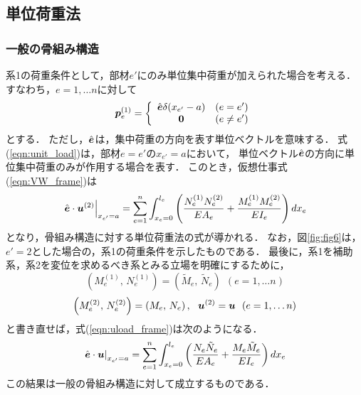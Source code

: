 \documentclass[10pt,a4j]{jarticle}
\begin{document}
\subsection{単位荷重法}
\subsubsection{一般の骨組み構造}
系1の荷重条件として，部材$e'$にのみ単位集中荷重が加えられた場合を考える．
すなわち，$e=1,\dots n$に対して
\begin{equation}
	\mbox{\boldmath $p$}_e^{(1)}=
	\left\{
	\begin{array}{cc}
	\hat{\mbox{\boldmath $e$}}\delta (x_{e'}-a) & (e=e') \\
	\mbox{\boldmath $0$} & (e\neq e')
	\end{array}
	\right.
	\label{eqn:unit_load}
\end{equation}
とする．
ただし，$\hat{\mbox{\boldmath $e$}}$は，集中荷重の方向を表す単位ベクトルを意味する．
式(\ref{eqn:unit_load})は，部材$e=e'$の$x_{e'}=a$において，
単位ベクトル$\hat{\mbox{\boldmath $e$}}$の方向に単位集中荷重のみが作用する場合を表す．
このとき，仮想仕事式(\ref{eqn:VW_frame})は
\begin{equation}
	\left.
	\hat{\mbox{\boldmath $e$}}\cdot \mbox{\boldmath $u$}^{(2)}
	\right|_{x_{e'}=a}
	=
	\sum_{e=1}^n 
	\int_{x_e=0}^{l_e} 
	\left(
	\frac{N_e^{(1)}N_e^{(2)}}{EA_e}
	+
	\frac{M_e^{(1)}M_e^{(2)}}{EI_e}
	\right)
	dx_e
	\label{eqn:uload_frame}
\end{equation}
となり，骨組み構造に対する単位荷重法の式が導かれる．
なお，図\ref{fig:fig6}は，$e'=2$とした場合の，系1の荷重条件を示したものである．
最後に，系1を補助系，系2を変位を求めるべき系とみる立場を明確にするために，
\begin{equation}
	\left(M^{(1)}_e,\, N_e^{(1)}\right)
	=
	\left(	\tilde M_e,\, \tilde N_e \right)
	\ \ (e=1,\dots n)
\end{equation}
\begin{equation}
	\left(M^{(2)}_e,\,N_e^{(2)}\right)
	=
	\left( M_e,\, N_e \right), \ \ 
	\fat{u}^{(2)}=\fat{u}
	\ \ (e=1,\dots n)
	\label{eqn:}
\end{equation}
と書き直せば，式(\ref{eqn:uload_frame})は次のようになる．
\begin{equation}
	\left.
	\hat{\mbox{\boldmath $e$}}\cdot \mbox{\boldmath $u$}
	\right|_{x_{e'}=a}
	=
	\sum_{e=1}^n 
	\int_{x_e=0}^{l_e} 
	\left(
	\frac{N_e \tilde N_e}{EA_e}
	+
	\frac{M_e \tilde M_e}{EI_e}
	\right)
	dx_e
	\label{eqn:uload_frame2}
\end{equation}
この結果は一般の骨組み構造に対して成立するものである．
\end{document}
